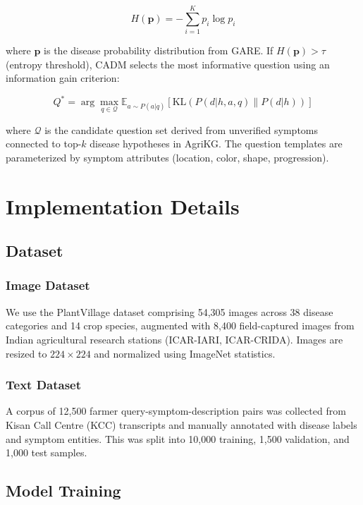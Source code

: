 \documentclass[conference]{IEEEtran}
\begin{document}
\begin{equation}
H(\mathbf{p}) = -\sum_{i=1}^{K} p_i \log p_i
\end{equation}

where $\mathbf{p}$ is the disease probability distribution from GARE. If $H(\mathbf{p}) > \tau$ (entropy threshold), CADM selects the most informative question using an information gain criterion:

\begin{equation}
Q^* = \arg\max_{q \in \mathcal{Q}} \mathbb{E}_{a \sim P(a|q)}\left[\text{KL}(P(d|h,a,q) \| P(d|h))\right]
\end{equation}

where $\mathcal{Q}$ is the candidate question set derived from unverified symptoms connected to top-$k$ disease hypotheses in AgriKG. The question templates are parameterized by symptom attributes (location, color, shape, progression).

\section{Implementation Details}
\label{sec:implementation}

\subsection{Dataset}

\subsubsection{Image Dataset}

We use the PlantVillage dataset \cite{plantvillage} comprising 54,305 images across 38 disease categories and 14 crop species, augmented with 8,400 field-captured images from Indian agricultural research stations (ICAR-IARI, ICAR-CRIDA). Images are resized to $224 \times 224$ and normalized using ImageNet statistics.

\subsubsection{Text Dataset}

A corpus of 12,500 farmer query-symptom-description pairs was collected from Kisan Call Centre (KCC) transcripts and manually annotated with disease labels and symptom entities. This was split into 10,000 training, 1,500 validation, and 1,000 test samples.

\subsection{Model Training}
\end{document}
